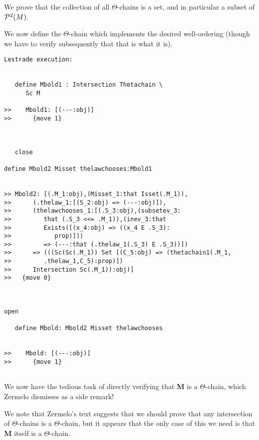 \documentclass[12pt]{article}
\begin{document}
We prove that the collection of all $\Theta$-chains is a set, and in particular a subset of ${\cal P}^2(M)$.

We now define the $\Theta$-chain which implements the desired well-ordering (though we have to verify subsequently that that is what it is).

\begin{verbatim}Lestrade execution:


   define Mbold1 : Intersection Thetachain \
      Sc M

>>    Mbold1: [(---:obj)]
>>      {move 1}



   close

define Mbold2 Misset thelawchooses:Mbold1


>> Mbold2: [(.M_1:obj),(Misset_1:that Isset(.M_1)),
>>      (.thelaw_1:[(S_2:obj) => (---:obj)]),
>>      (thelawchooses_1:[(.S_3:obj),(subsetev_3:
>>         that (.S_3 <<= .M_1)),(inev_3:that
>>         Exists([(x_4:obj) => ((x_4 E .S_3):
>>            prop)]))
>>         => (---:that (.thelaw_1(.S_3) E .S_3))])
>>      => (((Sc(Sc(.M_1)) Set [(C_5:obj) => (thetachain1(.M_1,
>>         .thelaw_1,C_5):prop)])
>>      Intersection Sc(.M_1)):obj)]
>>   {move 0}



open

   define Mbold: Mbold2 Misset thelawchooses


>>    Mbold: [(---:obj)]
>>      {move 1}


\end{verbatim}

We now have the tedious task of directly verifying that {\bf M} is a $\Theta$-chain, which Zermelo dismisses as a side remark!

We note that Zermelo's text suggests that we should prove that any intersection of $\Theta$-chains is a $\Theta$-chain, but it appears that the only case
of this we need is that  {\bf M} itself is a $\Theta$-chain.
\end{document}
